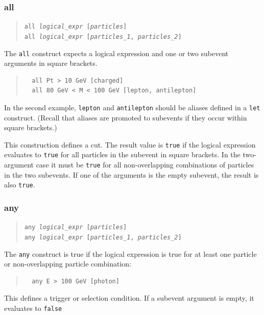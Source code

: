 \documentclass[12pt]{book}
\newcommand{\ttt}[1]{\texttt{#1}}
\begin{document}
\subsubsection{all}
\begin{quote}
\begin{footnotesize}
  \ttt{all \textit{logical\_expr} [\textit{particles}]} \\
  \ttt{all \textit{logical\_expr} [\textit{particles\_1}, \textit{particles\_2}]}
\end{footnotesize}
\end{quote}
The \ttt{all} construct expects a logical expression and one or two subevent
arguments in square brackets.
\begin{quote}
\begin{footnotesize}
\begin{verbatim}
  all Pt > 10 GeV [charged]
  all 80 GeV < M < 100 GeV [lepton, antilepton]
\end{verbatim}
\end{footnotesize}
\end{quote}
In the second example, \ttt{lepton} and \ttt{antilepton} should be aliases
defined in a \ttt{let} construct.  (Recall that aliases are promoted to
subevents if they occur within square brackets.)

This construction defines a cut.  The result value is \ttt{true} if the
logical expression evaluates to \ttt{true} for all particles in the subevent
in square brackets.  In the two-argument case it must be \ttt{true} for all
non-overlapping combinations of particles in the two subevents.  If one of the
arguments is the empty subevent, the result is also \ttt{true}.

\subsubsection{any}
\begin{quote}
\begin{footnotesize}
  \ttt{any \textit{logical\_expr} [\textit{particles}]} \\
  \ttt{any \textit{logical\_expr} [\textit{particles\_1}, \textit{particles\_2}]}
\end{footnotesize}
\end{quote}
The \ttt{any} construct is true if the logical expression is true for at least
one particle or non-overlapping particle combination:
\begin{quote}
\begin{footnotesize}
\begin{verbatim}
  any E > 100 GeV [photon]
\end{verbatim}
\end{footnotesize}
\end{quote}
This defines a trigger or selection condition.  If a subevent argument is
empty, it evaluates to \ttt{false}
\end{document}
